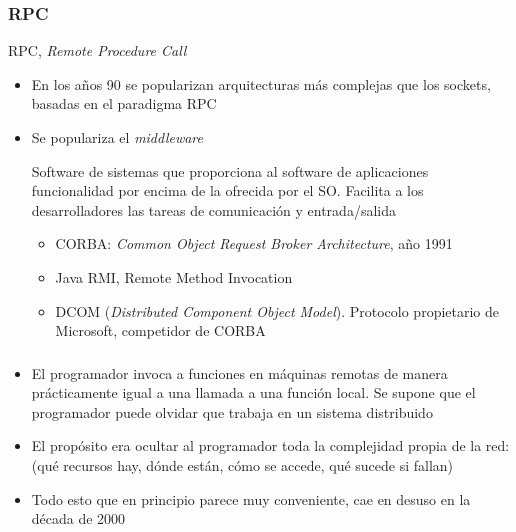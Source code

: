 \documentclass[ucs]{beamer}
\begin{document}
\begin{frame}[fragile]
\frametitle{RPC}
RPC, \emph{Remote Procedure Call}
\begin{itemize}
\item
En los años 90 se popularizan arquitecturas más complejas que los sockets, basadas
en el paradigma RPC

\item
Se populariza el \emph{middleware}

Software de sistemas que proporciona al software de aplicaciones funcionalidad
por encima de la ofrecida por el SO. Facilita a los desarrolladores las tareas
de comunicación y entrada/salida

\begin{itemize}
\item
CORBA: \emph{Common Object Request Broker Architecture}, año 1991
\item
Java RMI, Remote Method Invocation
\item
DCOM (\emph{Distributed Component Object Model}). Protocolo
propietario de Microsoft, competidor de CORBA
\end{itemize}


\end{itemize}
\end{frame}
\begin{frame}[fragile]
\frametitle{}
\begin{itemize}

\item
El programador invoca a funciones en máquinas remotas de manera prácticamente igual
a una llamada a una función local. Se supone que el programador puede olvidar
que trabaja en un sistema distribuido

\item
El propósito era ocultar al programador toda la complejidad propia de la red:
(qué recursos hay, dónde están, cómo se accede, qué sucede si fallan)



\item
Todo esto que en principio parece muy conveniente, cae en desuso en la década de 2000
\end{itemize}
\end{frame}
\end{document}
